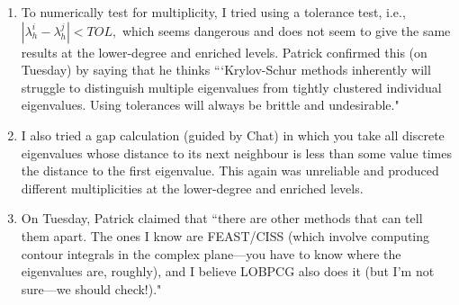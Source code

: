\documentclass[12pt,a4paper]{article}
\begin{document}
\begin{enumerate}
    \begin{enumerate}
        \item Let $\lambda$ be an eigenvalue of multiplicity $k,$ approximated by the discrete eigenvalues $\lambda_h^1, \dots, \lambda_h^k$. Consider the two computed eigenbases $Q$ and $W$ where $Q$ holds the computed lower-degree eigenbasis, say $u_h^1, \dots, u_h^k$, and $W$ holds the computed enriched eigenbasis, say $w_h^1, \dots, w_h^k.$ We assume (or do computations to ensure) that each basis is m-orthonormal. (where the eigenproblem is $a(u, v) = \lambda m(u, v)$).
        \item Compute the overlap matrix $C$, where $C_{i,j} = m(u_h^i, w_h^j)$. Ideally, we would like $C = I.$
        \item We seek a unitary $R$ such that $WR$ is aligned with $Q$ and the corresponding overlap matrix, $C \overline R$ is close to the identity (where the presence of the conjugate depends on the inner product convention). 
        \item Setting $X = \overline R$ we solve $\min_{X^*X = I} \| CX - I \|_{F}$ which has solution $X = VU^*$, where $C = U \Sigma V^*$ is the SVD of $C.$
    \end{enumerate}

    \item To numerically test for multiplicity, I tried using a tolerance test, i.e., $|\lambda_h^{i}-\lambda_h^{j}| < TOL,$ which seems dangerous and does not seem to give the same results at the lower-degree and enriched levels. Patrick confirmed this (on Tuesday) by saying that he thinks ```Krylov-Schur methods inherently will struggle to distinguish multiple eigenvalues from tightly clustered individual eigenvalues. Using tolerances will always be brittle and undesirable."
    \item I also tried a gap calculation (guided by Chat) in which you take all discrete eigenvalues whose distance to its next neighbour is less than some value times the distance to the first eigenvalue. This again was unreliable and produced different multiplicities at the lower-degree and enriched levels. 
    \item On Tuesday, Patrick claimed that ``there are other methods that can tell them apart. The ones I know are FEAST/CISS (which involve computing contour integrals in the complex plane---you have to know where the eigenvalues are, roughly), and I believe LOBPCG also does it (but I'm not sure---we should check!)."

    
\end{enumerate}
\end{document}
